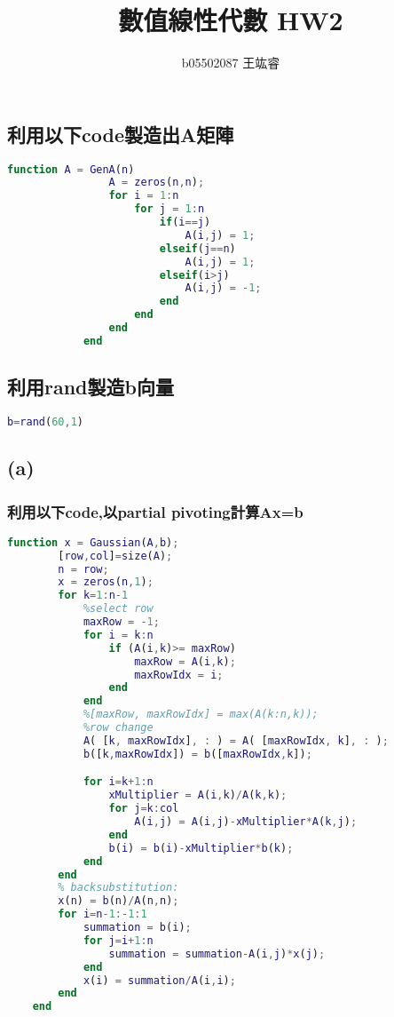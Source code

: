 \documentclass[12pt]{article}
\author{b05502087 王竑睿}
\date{}
\title{數值線性代數 HW2}
\begin{document}
\maketitle
\section{}
    \subsection*{利用以下code製造出A矩陣}
        \begin{lstlisting}[language={Matlab}]
            function A = GenA(n)
                A = zeros(n,n);
                for i = 1:n 
                    for j = 1:n
                        if(i==j) 
                            A(i,j) = 1;
                        elseif(j==n)
                            A(i,j) = 1;
                        elseif(i>j)
                            A(i,j) = -1;
                        end
                    end 
                end
            end
        \end{lstlisting}
    \subsection*{利用rand製造b向量}
        \begin{lstlisting}[language={Matlab}]
            b=rand(60,1)
        \end{lstlisting}
    \subsection*{(a)}
        \subsubsection*{利用以下code,以partial pivoting計算Ax=b}
    \begin{lstlisting}[language={Matlab}]
    function x = Gaussian(A,b);
        [row,col]=size(A);
        n = row;
        x = zeros(n,1);
        for k=1:n-1  
            %select row 
            maxRow = -1;
            for i = k:n
                if (A(i,k)>= maxRow)
                    maxRow = A(i,k);
                    maxRowIdx = i;
                end
            end
            %[maxRow, maxRowIdx] = max(A(k:n,k));
            %row change
            A( [k, maxRowIdx], : ) = A( [maxRowIdx, k], : );
            b([k,maxRowIdx]) = b([maxRowIdx,k]);

            for i=k+1:n
                xMultiplier = A(i,k)/A(k,k);
                for j=k:col
                    A(i,j) = A(i,j)-xMultiplier*A(k,j);
                end
                b(i) = b(i)-xMultiplier*b(k);
            end
        end
        % backsubstitution:
        x(n) = b(n)/A(n,n);
        for i=n-1:-1:1
            summation = b(i);
            for j=i+1:n
                summation = summation-A(i,j)*x(j);
            end
            x(i) = summation/A(i,i);
        end
    end
    \end{lstlisting}
\end{document}
